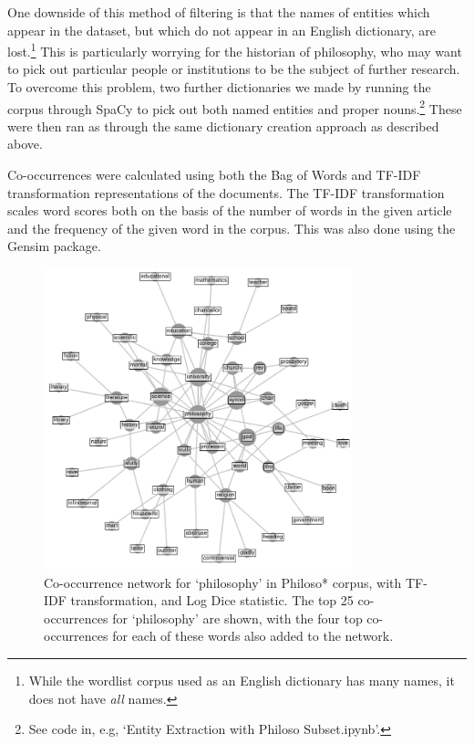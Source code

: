 \documentclass{article}
\begin{document}
One downside of this method of filtering is that the names of entities which appear in the dataset, but which do not appear in an English dictionary, are lost.\footnote{While the wordlist corpus used as an English dictionary has many names, it does not have \emph{all} names.} This is particularly worrying for the historian of philosophy, who may want to pick out particular people or institutions to be the subject of further research. To overcome this problem, two further dictionaries we made by  running the corpus through SpaCy \cite{spacy} to pick out both named entities and proper nouns.\footnote{See code in, e.g, `Entity Extraction with Philoso Subset.ipynb'.} These were then ran as through the same dictionary creation approach as described above.

Co-occurrences were calculated using both the Bag of Words and TF-IDF transformation representations of the documents. The TF-IDF transformation scales word scores both on the basis of the number of words in the given article and the frequency of the given word in the corpus. This was also done using the Gensim package.

\begin{figure}
    \centering
    \includegraphics[width=0.8\textwidth]{images/philo_cooccurrence.png}
    \caption{Co-occurrence network for `philosophy' in Philoso* corpus, with TF-IDF transformation, and Log Dice statistic. The top 25 co-occurrences for `philosophy' are shown, with the four top co-occurrences for each of these words also added to the network.}
    \label{f:cooccurrence}
\end{figure}
\end{document}
